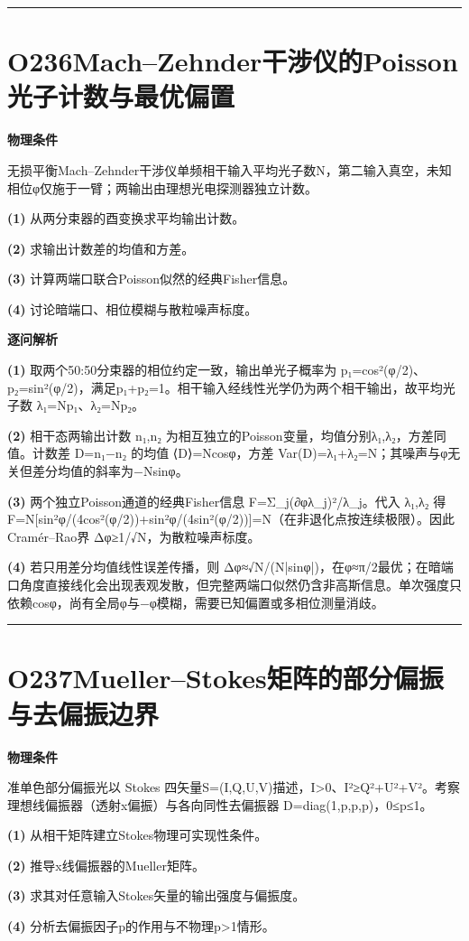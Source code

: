 \documentclass[UTF8,a4paper,11pt,oneside,openany]{ctexbook}
\begin{document}
\par\bigskip\hrule\bigskip
\section*{O236\quad Mach–Zehnder干涉仪的Poisson光子计数与最优偏置}
\textbf{物理条件}\par 无损平衡Mach–Zehnder干涉仪单频相干输入平均光子数N，第二输入真空，未知相位φ仅施于一臂；两输出由理想光电探测器独立计数。
\par\noindent\textbf{(1)} 从两分束器的酉变换求平均输出计数。
\par\noindent\textbf{(2)} 求输出计数差的均值和方差。
\par\noindent\textbf{(3)} 计算两端口联合Poisson似然的经典Fisher信息。
\par\noindent\textbf{(4)} 讨论暗端口、相位模糊与散粒噪声标度。

\par\medskip\noindent\textbf{逐问解析}
\par\noindent\textbf{(1)} 取两个50:50分束器的相位约定一致，输出单光子概率为 p₁=cos²(φ/2)、p₂=sin²(φ/2)，满足p₁+p₂=1。相干输入经线性光学仍为两个相干输出，故平均光子数 λ₁=Np₁、λ₂=Np₂。
\par\noindent\textbf{(2)} 相干态两输出计数 n₁,n₂ 为相互独立的Poisson变量，均值分别λ₁,λ₂，方差同值。计数差 D=n₁−n₂ 的均值 ⟨D⟩=Ncosφ，方差 Var(D)=λ₁+λ₂=N；其噪声与φ无关但差分均值的斜率为−Nsinφ。
\par\noindent\textbf{(3)} 两个独立Poisson通道的经典Fisher信息 F=Σ\_j(∂φλ\_j)²/λ\_j。代入 λ₁,λ₂ 得 F=N[sin²φ/(4cos²(φ/2))+sin²φ/(4sin²(φ/2))]=N（在非退化点按连续极限）。因此Cramér–Rao界 Δφ≥1/√N，为散粒噪声标度。
\par\noindent\textbf{(4)} 若只用差分均值线性误差传播，则 Δφ≈√N/(N|sinφ|)，在φ≈π/2最优；在暗端口角度直接线化会出现表观发散，但完整两端口似然仍含非高斯信息。单次强度只依赖cosφ，尚有全局φ与−φ模糊，需要已知偏置或多相位测量消歧。

\par\bigskip\hrule\bigskip
\section*{O237\quad Mueller–Stokes矩阵的部分偏振与去偏振边界}
\textbf{物理条件}\par 准单色部分偏振光以 Stokes 四矢量S=(I,Q,U,V)描述，I>0、I²≥Q²+U²+V²。考察理想线偏振器（透射x偏振）与各向同性去偏振器 D=diag(1,p,p,p)，0≤p≤1。
\par\noindent\textbf{(1)} 从相干矩阵建立Stokes物理可实现性条件。
\par\noindent\textbf{(2)} 推导x线偏振器的Mueller矩阵。
\par\noindent\textbf{(3)} 求其对任意输入Stokes矢量的输出强度与偏振度。
\par\noindent\textbf{(4)} 分析去偏振因子p的作用与不物理p>1情形。
\end{document}
